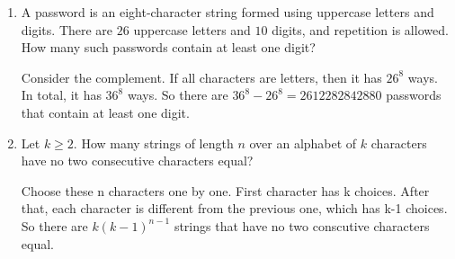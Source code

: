 \documentclass[11pt]{article}
\begin{document}
\begin{enumerate}
We choose 2 students for 5 times. So it has $\binom{10}{2}\binom{8}{2}\binom{6}{2}\binom{4}{2}\binom{2}{2}$ ways.

However, we need to consider permutation of groups. For each division, there are $5!$ permutations. 

So there are $\frac{\binom{10}{2}\binom{8}{2}\binom{6}{2}\binom{4}{2}\binom{2}{2}}{5!}=945$ ways.

\item
A password is an eight-character string formed using uppercase letters and digits. There are \(26\) uppercase letters and \(10\) digits, and repetition is allowed. How many such passwords contain at least one digit?

Consider the complement. If all characters are letters, then it has $26^8$ ways. In total, it has $36^8$ ways. So there are $36^8-26^8=2612282842880$ passwords that contain at least one digit.

\item
Let \(k\geq 2\). How many strings of length \(n\) over an alphabet of \(k\) characters have no two consecutive characters equal?

Choose these n characters one by one. First character has k choices. After that, each character is different from the previous one, which has k-1 choices. So there are $k(k-1)^{n-1}$ strings that have no two conscutive characters equal.

\end{enumerate}
\end{document}
